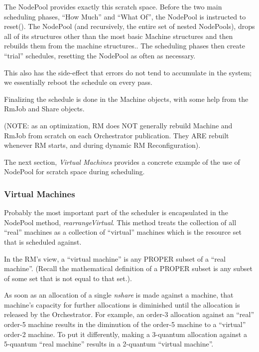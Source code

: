     The NodePool provides exactly this scratch space.  Before the two main scheduling phases, ``How
    Much'' and ``What Of'', the NodePool is instructed to reset().  The NodePool (and recursively,
    the entire set of nested NodePools), drops all of its structures other than the most basic Machine
    structures and then rebuilds them from the machine structures..  The scheduling phases then create
    ``trial'' schedules, resetting the NodePool as often as necessary.

    This also has the side-effect that errors do not tend to accumulate in the system; we essentially
    reboot the schedule on every pass.

    Finalizing the schedule is done in the Machine objects, with some help from the RmJob and
    Share objects.  

    (NOTE: as an optimization, RM does NOT generally rebuild Machine and RmJob from scratch on each
    Orchestrator publication.  They ARE rebuilt whenever RM starts, and during dynamic RM Reconfiguration).

    The next section, {\em Virtual Machines} provides a concrete example of the use of NodePool for
    scratch space during scheduling.

\subsubsection{Virtual Machines}
    Probably the most important part of the scheduler is encapsulated in the NodePool method,
    {\em rearrangeVirtual}.  This method treats the collection of all ``real'' machines as
    a collection of ``virtual'' machines which is the resource set that is scheduled against.

    In the RM's view, a ``virtual machine'' is any PROPER subset of a ``real machine''.  (Recall
    the mathematical definition of a PROPER subset is any subset of some set that is not equal
    to that set.). 

    As soon as an allocation of a single {\em nshare} is made against a machine, that machine's
    capacity for further allocations is diminished until the allocation is released by the Orchestrator.  For example, an
    order-3 allocation against an ``real'' order-5 machine results in the diminution of the order-5 machine
    to a ``virtual'' order-2 machine.  To put it differently, making a 3-quantum allocation against a 5-quantum
    ``real machine'' results in a 2-quantum ``virtual machine''.
    

